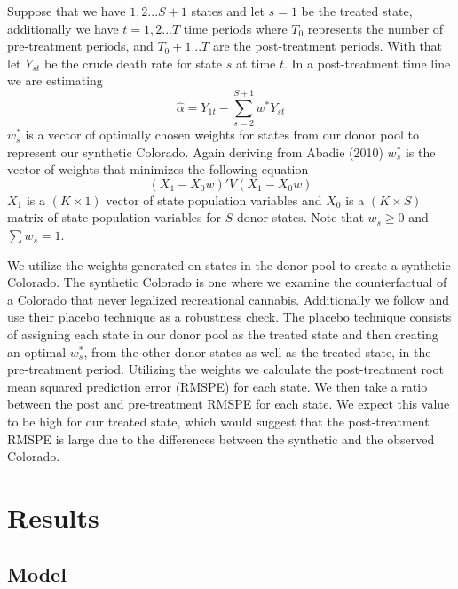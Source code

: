 \documentclass{article}
\begin{document}
Suppose that we have $1,2...S+1$ states and let $s = 1$ be the treated state, additionally we have $t = 1,2...T$ time periods where $T_0$ represents the number of pre-treatment periods, and $T_0 + 1...T$ are the post-treatment periods. With that let $Y_{st}$ be the crude death rate for state $s$ at time $t$. In a post-treatment time line we are estimating
\begin{equation*}
\hat{\alpha} = Y_{1t} - \sum_{s=2}^{S+1}w^{*}Y_{st}
\end{equation*}
$w^{*}_s$ is a vector of optimally chosen weights for states from our donor pool to represent our synthetic Colorado. Again deriving from Abadie (2010) $w^{*}_s$ is the vector of weights that minimizes the following equation
\begin{equation*}
(X_1 - X_0w)'V(X_1 - X_0w)
\end{equation*}
$X_1$ is a $(K \times 1)$ vector of state population variables and $X_0$ is a $(K \times S)$ matrix of state population variables for $S$ donor states. Note that $w_s \geq 0$ and $\sum w_s = 1$.

We utilize the weights generated on states in the donor pool to create a synthetic Colorado. The synthetic Colorado is one where we examine the counterfactual of a Colorado that never legalized recreational cannabis. Additionally we follow \citet{AbadieAlberto2010SCMf} and use their placebo technique as a robustness check. The placebo technique consists of assigning each state in our donor pool as the treated state and then creating an optimal $w^{*}_s$, from the other donor states as well as the treated state, in the pre-treatment period. Utilizing the weights we calculate the post-treatment root mean squared prediction error (RMSPE) for each state. We then take a ratio between the post and pre-treatment RMSPE for each state. We expect this value to be high for our treated state, which would suggest that the post-treatment RMSPE is large due to the differences between the synthetic and the observed Colorado.

\section{Results}

\subsection{Model}
\end{document}

